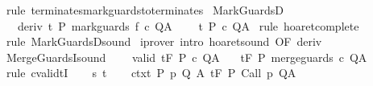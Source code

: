 \begin{isabellebody}
\ {\isacharparenleft}rule\ terminates{\isacharunderscore}mark{\isacharunderscore}guards{\isacharunderscore}to{\isacharunderscore}terminates{\isacharparenright}\isanewline
{}\isamarkupfalse%
%
\endisatagproof
{\isafoldproof}%
%
\isadelimproof
\isanewline
%
\endisadelimproof
\isanewline
{}\isamarkupfalse%
\ MarkGuardsD{\isacharcolon}\ \isanewline
\ \ \ deriv{\isacharcolon}\ {\isachardoublequoteopen}{\isasymGamma}{\isacharcomma}{\isasymTheta}{\isasymturnstile}\isactrlsub t\isactrlbsub {\isacharslash}{\isacharbraceleft}{\isacharbraceright}\isactrlesub \ P\ mark{\isacharunderscore}guards\ f\ c\ Q{\isacharcomma}A{\isachardoublequoteclose}\ \isanewline
\ \ \ {\isachardoublequoteopen}{\isasymGamma}{\isacharcomma}{\isasymTheta}{\isasymturnstile}\isactrlsub t\isactrlbsub {\isacharslash}{\isacharbraceleft}{\isacharbraceright}\isactrlesub \ P\ c\ Q{\isacharcomma}A{\isachardoublequoteclose}\isanewline
%
\isadelimproof
%
\endisadelimproof
%
\isatagproof
{}\isamarkupfalse%
\ {\isacharparenleft}rule\ hoaret{\isacharunderscore}complete{\isacharprime}{\isacharparenright}\isanewline
{}\isamarkupfalse%
\ {\isacharparenleft}rule\ MarkGuardsD{\isacharunderscore}sound{\isacharparenright}\isanewline
{}\isamarkupfalse%
\ {\isacharparenleft}iprover\ intro{\isacharcolon}\ hoaret{\isacharunderscore}sound\ {\isacharbrackleft}OF\ deriv{\isacharbrackright}{\isacharparenright}\isanewline
{}\isamarkupfalse%
%
\endisatagproof
{\isafoldproof}%
%
\isadelimproof
\isanewline
%
\endisadelimproof
\isanewline
{}\isamarkupfalse%
\ MergeGuardsI{\isacharunderscore}sound{\isacharcolon}\ \isanewline
\ \ \ valid{\isacharcolon}\ {\isachardoublequoteopen}{\isasymGamma}{\isacharcomma}{\isasymTheta}{\isasymTurnstile}\isactrlsub t\isactrlbsub {\isacharslash}F\isactrlesub \ P\ c\ Q{\isacharcomma}A{\isachardoublequoteclose}\isanewline
\ \ \ {\isachardoublequoteopen}{\isasymGamma}{\isacharcomma}{\isasymTheta}{\isasymTurnstile}\isactrlsub t\isactrlbsub {\isacharslash}F\isactrlesub \ P\ merge{\isacharunderscore}guards\ c\ Q{\isacharcomma}A{\isachardoublequoteclose}\isanewline
%
\isadelimproof
%
\endisadelimproof
%
\isatagproof
{}\isamarkupfalse%
\ {\isacharparenleft}rule\ cvalidtI{\isacharparenright}\isanewline
\ \ \isamarkupfalse%
\ s\ t\isanewline
\ \ \isamarkupfalse%
\ ctxt{\isacharcolon}\ {\isachardoublequoteopen}{\isasymforall}{\isacharparenleft}P{\isacharcomma}\ p{\isacharcomma}\ Q{\isacharcomma}\ A{\isacharparenright}{\isasymin}{\isasymTheta}{\isachardot}\ {\isasymGamma}{\isasymTurnstile}\isactrlsub t\isactrlbsub {\isacharslash}F\isactrlesub \ P\ {\isacharparenleft}Call\ p{\isacharparenright}\ Q{\isacharcomma}A{\isachardoublequoteclose}\ \isanewline

\end{isabellebody}
